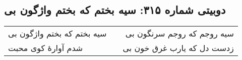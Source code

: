 \begin{center}
\section*{دوبیتی شماره ۳۱۵: سیه بختم که بختم واژگون بی}
\label{sec:315}
\begin{longtable}{l p{0.5cm} r}
سیه بختم که بختم واژگون بی
&&
سیه روجم که روجم سرنگون بی
\\
شدم آوارهٔ کوی محبت
&&
زدست دل که یارب غرق خون بی
\\
\end{longtable}
\end{center}
